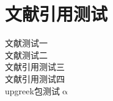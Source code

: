 \chapter{文献引用测试}

文献测试一\cite{xiu2010numerical}\\
文献测试二\cite{li2006numerical}\\
文献引用测试三\cite{xia2009real}\\
文献引用测试四\cite{xiu2002wiener}\\
upgreek包测试$\upalpha$

